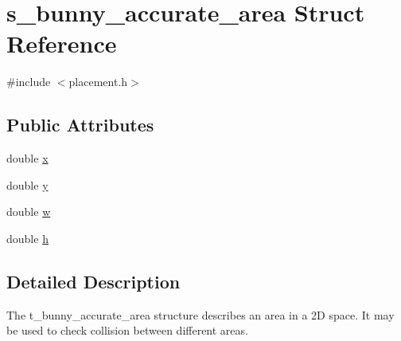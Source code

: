 \hypertarget{structs__bunny__accurate__area}{\section{s\-\_\-bunny\-\_\-accurate\-\_\-area Struct Reference}
\label{structs__bunny__accurate__area}
}


{\ttfamily \#include $<$placement.\-h$>$}

\subsection*{Public Attributes}
\begin{DoxyCompactItemize}
\item 
double \hyperlink{structs__bunny__accurate__area_a7d18c18334113b0d3dfe4f3ee75025a8}{x}
\item 
double \hyperlink{structs__bunny__accurate__area_a376f9c6f1e74b2a88d8866b8b07e47dc}{y}
\item 
double \hyperlink{structs__bunny__accurate__area_abc4cf7771d77df2caf9dcfb20fa06071}{w}
\item 
double \hyperlink{structs__bunny__accurate__area_a71fb55ce904abe4005b325c3b677b723}{h}
\end{DoxyCompactItemize}


\subsection{Detailed Description}
The t\-\_\-bunny\-\_\-accurate\-\_\-area structure describes an area in a 2\-D space. It may be used to check collision between different areas. 

